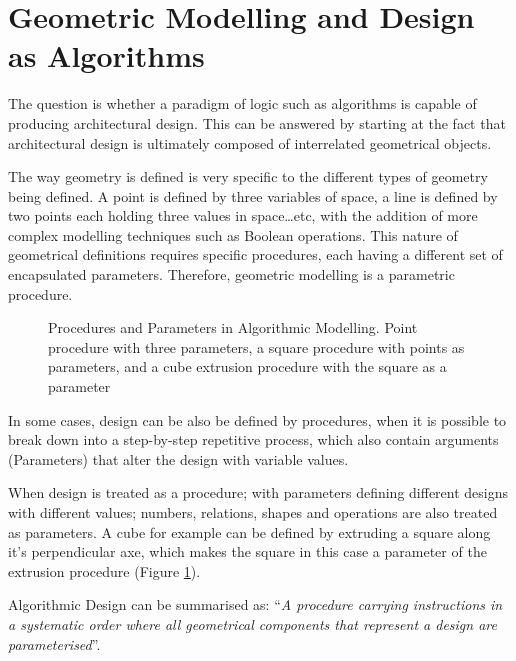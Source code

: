 \section{Geometric Modelling and Design as Algorithms}

The question is whether a paradigm of logic such as algorithms is capable of producing architectural
design. This can be answered by starting at the fact that architectural design is ultimately
composed of interrelated geometrical objects.

The way geometry is defined is very specific to the different types of geometry being defined. A
point is defined by three variables of space, a line is defined by two points each holding three
values in space\ldots etc, with the addition of more complex modelling techniques such as Boolean
operations. This nature of geometrical definitions requires specific procedures, each having a
different set of encapsulated parameters. Therefore, geometric modelling is a parametric
procedure. \cite{hernandez06}

\begin{figure}[htbp]
\centering
{}
\vspace{5mm}
\caption[Procedures and Parameters in Algorithmic Modelling]{Procedures and Parameters in
Algorithmic Modelling. {\footnotesize Point procedure with three parameters, a square procedure with
points as parameters, and a cube extrusion procedure with the square as a parameter}}
\label{SqrAnalysis}
\end{figure}

In some cases, design can be also be defined by procedures, when it is possible to break down into a
step-by-step repetitive process, which also contain arguments (Parameters) that alter the design
with variable values.

When design is treated as a procedure; with parameters defining different designs with different
values; numbers, relations, shapes and operations are also treated as parameters. A cube for example
can be defined by extruding a square along it's perpendicular axe, which makes the square in this
case a parameter of the extrusion procedure (Figure \ref{SqrAnalysis}).

Algorithmic Design can be summarised as: ``\emph{A procedure carrying instructions in a systematic
order where all geometrical components that represent a design are
parameterised}''. \cite{hernandez06}
